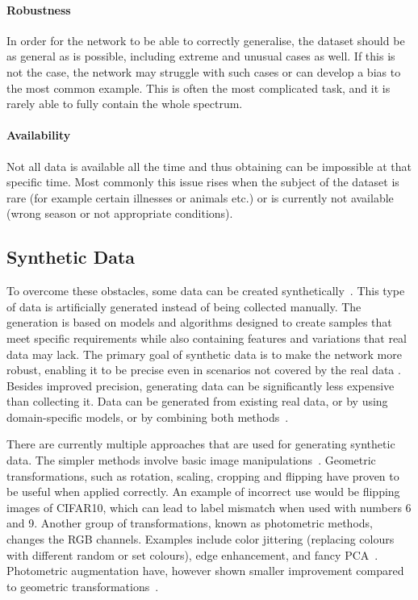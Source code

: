 \paragraph{Robustness} In order for the network to be able to correctly generalise, the dataset should be as general as is possible, including extreme and unusual cases as well. If this is not the case, the network may struggle with such cases or can develop a bias to the most common example. This is often the most complicated task, and it is rarely able to fully contain the whole spectrum.
\paragraph{Availability} Not all data is available all the time and thus obtaining can be impossible at that specific time. Most commonly this issue rises when the subject of the dataset is rare (for example certain illnesses or animals etc.) or is currently not available (wrong season or not appropriate conditions).

\subsection{Synthetic Data}
To overcome these obstacles, some data can be created synthetically~\cite{synthDataReview}. This type of data is artificially generated instead of being collected manually. The generation is based on models and algorithms designed to create samples that meet specific requirements while also containing features and variations that real data may lack. The primary goal of synthetic data is to make the network more robust, enabling it to be precise even in scenarios not covered by the real data \cite{synthDataRobust}. Besides improved precision, generating data can be significantly less expensive than collecting it. Data can be generated from existing real data, or by using domain-specific models, or by combining both methods~\cite{synthData}.

There are currently multiple approaches that are used for generating synthetic data. The simpler methods involve basic image manipulations~\cite{synthEasy}. Geometric transformations, such as rotation, scaling, cropping and flipping have proven to be useful when applied correctly. An example of incorrect use would be flipping images of CIFAR10, which can lead to label mismatch when used with numbers 6 and 9. Another group of transformations, known as photometric methods, changes the RGB channels. Examples include color jittering (replacing colours with different random or set colours), edge enhancement, and fancy PCA~\cite{fancypca}. Photometric augmentation have, however shown smaller improvement compared to geometric transformations~\cite{syntheticBasic}.

